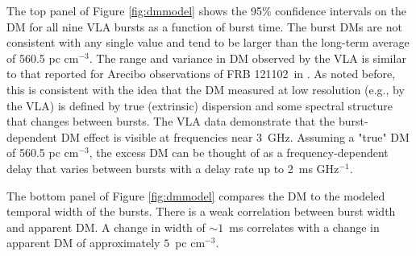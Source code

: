 \documentclass[twocolumn]{aastex61}
\newcommand{\frb}{FRB 121102}
\begin{document}
The top panel of Figure \ref{fig:dmmodel} shows the 95\% confidence intervals on the DM for all nine VLA bursts as a function of burst time. The burst DMs are not consistent with any single value and tend to be larger than the long-term average of 560.5 pc cm$^{-3}$. The range and variance in DM observed by the VLA is similar to that reported for Arecibo observations of \frb\ in \citet{2016arXiv160308880S}. As noted before, this is consistent with the idea that the DM measured at low resolution (e.g., by the VLA) is defined by true (extrinsic) dispersion and some spectral structure that changes between bursts. The VLA data demonstrate that the burst-dependent DM effect is visible at frequencies near 3~GHz. Assuming a "true" DM of 560.5 pc cm$^{-3}$, the excess DM can be thought of as a frequency-dependent delay that varies between bursts with a delay rate up to 2~ms GHz$^{-1}$.

The bottom panel of Figure \ref{fig:dmmodel} compares the DM to the modeled temporal width of the bursts. There is a weak correlation between burst width and apparent DM. A change in width of $\sim1$~ms correlates with a change in apparent DM of approximately $5$~pc cm$^{-3}$.
\end{document}
